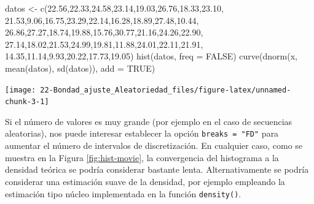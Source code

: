 \documentclass[
]{book}
\newenvironment{Shaded}{\begin{snugshade}}{\end{snugshade}}
\newcommand{\AttributeTok}[1]{\textcolor[rgb]{0.77,0.63,0.00}{#1}}
\newcommand{\ConstantTok}[1]{\textcolor[rgb]{0.00,0.00,0.00}{#1}}
\newcommand{\FloatTok}[1]{\textcolor[rgb]{0.00,0.00,0.81}{#1}}
\newcommand{\FunctionTok}[1]{\textcolor[rgb]{0.00,0.00,0.00}{#1}}
\newcommand{\NormalTok}[1]{#1}
\newcommand{\OtherTok}[1]{\textcolor[rgb]{0.56,0.35,0.01}{#1}}
\theoremstyle{break}
\theoremstyle{nonumberplain}
\begin{document}
\begin{Shaded}
\begin{Highlighting}[]
\NormalTok{datos }\OtherTok{\textless{}{-}} \FunctionTok{c}\NormalTok{(}\FloatTok{22.56}\NormalTok{,}\FloatTok{22.33}\NormalTok{,}\FloatTok{24.58}\NormalTok{,}\FloatTok{23.14}\NormalTok{,}\FloatTok{19.03}\NormalTok{,}\FloatTok{26.76}\NormalTok{,}\FloatTok{18.33}\NormalTok{,}\FloatTok{23.10}\NormalTok{,}
  \FloatTok{21.53}\NormalTok{,}\FloatTok{9.06}\NormalTok{,}\FloatTok{16.75}\NormalTok{,}\FloatTok{23.29}\NormalTok{,}\FloatTok{22.14}\NormalTok{,}\FloatTok{16.28}\NormalTok{,}\FloatTok{18.89}\NormalTok{,}\FloatTok{27.48}\NormalTok{,}\FloatTok{10.44}\NormalTok{,}
  \FloatTok{26.86}\NormalTok{,}\FloatTok{27.27}\NormalTok{,}\FloatTok{18.74}\NormalTok{,}\FloatTok{19.88}\NormalTok{,}\FloatTok{15.76}\NormalTok{,}\FloatTok{30.77}\NormalTok{,}\FloatTok{21.16}\NormalTok{,}\FloatTok{24.26}\NormalTok{,}\FloatTok{22.90}\NormalTok{,}
  \FloatTok{27.14}\NormalTok{,}\FloatTok{18.02}\NormalTok{,}\FloatTok{21.53}\NormalTok{,}\FloatTok{24.99}\NormalTok{,}\FloatTok{19.81}\NormalTok{,}\FloatTok{11.88}\NormalTok{,}\FloatTok{24.01}\NormalTok{,}\FloatTok{22.11}\NormalTok{,}\FloatTok{21.91}\NormalTok{,}
  \FloatTok{14.35}\NormalTok{,}\FloatTok{11.14}\NormalTok{,}\FloatTok{9.93}\NormalTok{,}\FloatTok{20.22}\NormalTok{,}\FloatTok{17.73}\NormalTok{,}\FloatTok{19.05}\NormalTok{)}
\FunctionTok{hist}\NormalTok{(datos, }\AttributeTok{freq =} \ConstantTok{FALSE}\NormalTok{)}
\FunctionTok{curve}\NormalTok{(}\FunctionTok{dnorm}\NormalTok{(x, }\FunctionTok{mean}\NormalTok{(datos), }\FunctionTok{sd}\NormalTok{(datos)), }\AttributeTok{add =} \ConstantTok{TRUE}\NormalTok{)}
\end{Highlighting}
\end{Shaded}

\begin{center}\texttt{[image: 22-Bondad\_ajuste\_Aleatoriedad\_files/figure-latex/unnamed-chunk-3-1]} \end{center}

Si el número de valores es muy grande (por ejemplo en el caso de secuencias aleatorias), nos puede interesar establecer la opción \texttt{breaks\ =\ "FD"} para aumentar el número de intervalos de discretización.
En cualquier caso, como se muestra en la Figura \ref{fig:hist-movie}, la convergencia del histograma a la densidad teórica se podría considerar bastante lenta.
Alternativamente se podría considerar una estimación suave de la densidad, por ejemplo empleando la estimación tipo núcleo implementada en la función \texttt{density()}.
\end{document}
